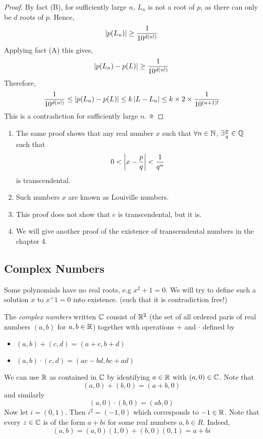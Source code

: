 \documentclass{article}
\begin{document}
\begin{proof}
    By fact (B), for sufficiently large $n$, $L_n$ is not a root of $p$, as there can only be $d$ roots of $p$.
    Hence,
    \[
        \left\lvert p(L_n)\right\rvert \geq \frac{1}{10^{d(n!)}} 
    \]
    Applying fact (A) this gives,
    \[
        \left\lvert p(L_n) - p(L)\right\rvert \geq \frac{1}{10^{d(n!)}} 
    \]
    Therefore,
    \[
        \frac{1}{10^{d(n!)}} \leq \left\lvert p(L_n) - p(L)\right\rvert \leq k \left\lvert L - L_n\right\rvert \leq k \times 2 \times \frac{1}{10^{(n+1)!}}
    \]
    This is a contradiction for sufficiently large $n$. $\contradiction$
\end{proof}

\begin{remark}\leavevmode
    \begin{enumerate}[label=(\arabic*)]
        \item The same proof shows that any real number $x$ such that $\forall n \in \mathbb{N}$, $\exists \frac{p}{q} \in \mathbb{Q}$
        such that
        \[
            0 < \left\lvert x - \frac{p}{q}\right\rvert < \frac{1}{q^n}  
        \]
        is transcendental.
        \item Such numbers $x$ are known as Louiville numbers.
        \item This proof does not show that $e$ is transcendental, but it is.
        \item We will give another proof of the existence of transcendental numbers in the chapter 4.
    \end{enumerate}
\end{remark}


\subsection{Complex Numbers}
Some polynomials have no real roots, e.g $x^2 + 1 = 0$.
We will try to define such a solution $x$ to $x^+1 = 0$ into existence. (such that it is contradiction free!)

The \emph{complex numbers} written $\mathbb{C}$ consist of $\mathbb{R}^2$ (the set of all ordered paris of real numbers $(a, b)$ for $a, b \in \mathbb{R}$)
together with operations $+$ and $\cdot$ defined by
\begin{itemize}
    \item $(a, b) + (c, d) = (a+c, b + d)$
    \item $(a, b) \cdot (c, d) = (ac - bd, bc + ad)$
\end{itemize}

We can use $\mathbb{R}$ as contained in $\mathbb{C}$ by identifying $a \in \mathbb{R}$ with
$(a, 0) \in \mathbb{C}$. Note that
\[
    (a, 0) + (b, 0) = (a+b, 0)
\]
and similarly
\[
    (a, 0) \cdot (b, 0) = (ab, 0)
\]
Now let $i = (0, 1)$. Then $i^2 = (-1, 0)$ which corresponds to $-1 \in \mathbb{R}$.
Note that every $z \in \mathbb{C}$ is of the form $a + bi$ for some real numbers $a, b \in R$.
Indeed,
\[
    (a, b) = (a, 0)(1, 0) + (b, 0)(0, 1) = a + bi
\]
\end{document}

